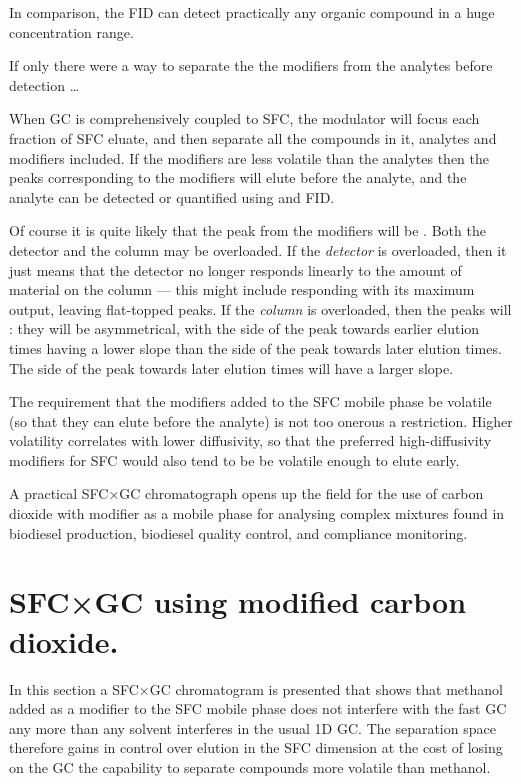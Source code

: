 In comparison, the FID can detect practically any organic compound in a huge
concentration range.

If only there were a way to separate the the modifiers from the analytes before
detection \ldots

When GC is comprehensively coupled to SFC, the modulator will focus each
fraction of SFC eluate, and then separate all the compounds in it, analytes and
modifiers included. If the modifiers are less volatile than the analytes then
the peaks corresponding to the modifiers will elute before the analyte, and the
analyte can be detected or quantified using and FID.

Of course it is quite likely that the peak from the modifiers will be
. Both the detector and the column may be overloaded. If the
\emph{detector} is overloaded, then it just means that the detector no longer
responds linearly to the amount of material on the column --- this might include
responding with its maximum output, leaving flat-topped peaks. If the
\emph{column} is overloaded, then the peaks will : they will be
asymmetrical, with the side of the peak towards earlier elution times having a
lower slope than the side of the peak towards later elution times. The side of
the peak towards later elution times will have a larger slope.

The requirement that the modifiers added to the SFC mobile phase be volatile (so
that they can elute before the analyte) is not too onerous a restriction. Higher
volatility correlates with lower diffusivity, so that the preferred
high-diffusivity modifiers for SFC  would also tend to be be volatile enough to
elute early.

A practical SFC×GC chromatograph opens up the field for the use of carbon
dioxide with modifier as a mobile phase for analysing complex mixtures found in
biodiesel production, biodiesel quality control, and compliance monitoring.

\section[SFC×GC with modifier]{SFC×GC using modified carbon dioxide.}

In this section a SFC×GC chromatogram is presented that shows that methanol
added as a modifier to the SFC mobile phase does not interfere with the fast GC
any more than any solvent interferes in the usual 1D GC. The separation space
therefore gains in control over elution in the SFC dimension at the cost of
losing on the GC the capability to separate compounds more volatile than
methanol.

